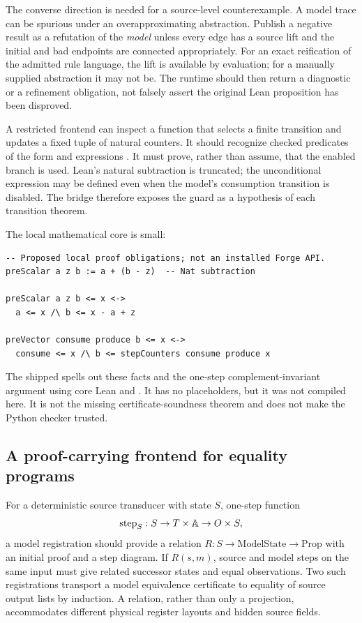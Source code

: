 The converse direction is needed for a source-level counterexample. A model
trace can be spurious under an overapproximating abstraction. Publish a negative
result as a refutation of the \emph{model} unless every edge has a source lift
and the initial and bad endpoints are connected appropriately. For an exact
reification of the admitted rule language, the lift is available by evaluation;
for a manually supplied abstraction it may not be. The runtime should then
return a diagnostic or a refinement obligation, not falsely assert the original
Lean proposition has been disproved.

A restricted frontend can inspect a function that selects a finite transition
and updates a fixed tuple of natural counters. It should recognize checked
predicates of the form  and expressions
. It must prove, rather than assume, that
the enabled branch is used. Lean's natural subtraction is truncated; the
unconditional expression may be defined even when the model's consumption
transition is disabled. The bridge therefore exposes the guard as a hypothesis
of each transition theorem.

The local mathematical core is small:
\begin{lstlisting}
-- Proposed local proof obligations; not an installed Forge API.
preScalar a z b := a + (b - z)  -- Nat subtraction

preScalar a z b <= x <->
  a <= x /\ b <= x - a + z

preVector consume produce b <= x <->
  consume <= x /\ b <= stepCounters consume produce x
\end{lstlisting}
The shipped  spells out these facts and the
one-step complement-invariant argument using core Lean and .
It has no placeholders, but it was not compiled here. It is not the missing
certificate-soundness theorem and does not make the Python checker trusted.

\subsection{A proof-carrying frontend for equality programs}
For a deterministic source transducer with state $S$, one-step function
\[
 \mathrm{step}_S:S\to T\times\mathbb A\to O\times S,
\]
a model registration should provide a relation $R:S\to\mathrm{ModelState}\to
\mathrm{Prop}$ with an initial proof and a step diagram. If
$R(s,m)$, source and model steps on the same input must give related successor
states and equal observations. Two such registrations transport a model
equivalence certificate to equality of source output lists by induction.
A relation, rather than only a projection, accommodates different physical
register layouts and hidden source fields.

